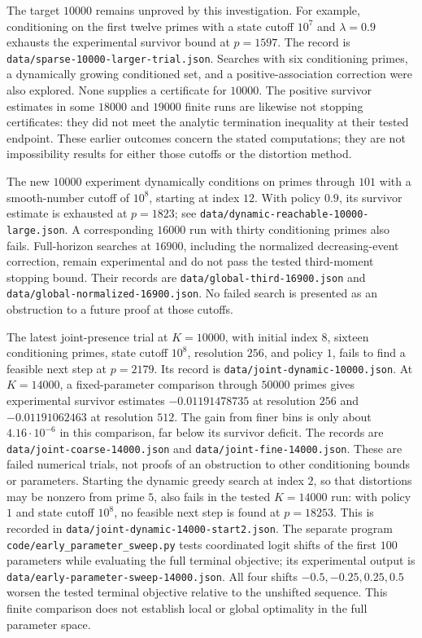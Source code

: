 \documentclass[11pt]{article}
\begin{document}
The target $10000$ remains unproved by this investigation. For example,
conditioning on the first twelve primes with a state cutoff $10^7$ and
$\lambda=0.9$ exhausts the experimental survivor bound at $p=1597$.
The record is \texttt{data/sparse-10000-larger-trial.json}. Searches with
six conditioning primes, a dynamically growing conditioned set, and a
positive-association correction were also explored. None supplies a
certificate for $10000$. The positive survivor estimates in some $18000$
and $19000$ finite runs are likewise not stopping certificates: they did
not meet the analytic termination inequality at their tested endpoint.
These earlier outcomes concern the stated computations; they are not impossibility
results for either those cutoffs or the distortion method.

The new $10000$ experiment dynamically conditions on primes through $101$
with a smooth-number cutoff of $10^8$, starting at index $12$. With policy
$0.9$, its survivor estimate is exhausted at $p=1823$; see
\texttt{data/dynamic-reachable-10000-large.json}. A corresponding $16000$
run with thirty conditioning primes also fails. Full-horizon searches at
$16900$, including the normalized decreasing-event correction, remain
experimental and do not pass the tested third-moment stopping bound.
Their records are \texttt{data/global-third-16900.json} and
\texttt{data/global-normalized-16900.json}. No failed search is presented
as an obstruction to a future proof at those cutoffs.

The latest joint-presence trial at $K=10000$, with initial index $8$,
sixteen conditioning primes, state cutoff $10^8$, resolution $256$, and
policy $1$, fails to find a feasible next step at $p=2179$. Its record is
\texttt{data/joint-dynamic-10000.json}. At $K=14000$, a fixed-parameter
comparison through $50000$ primes gives experimental survivor estimates
$-0.01191478735$ at resolution $256$ and $-0.01191062463$ at resolution
$512$. The gain from finer bins is only about $4.16\cdot10^{-6}$ in this
comparison, far below its survivor deficit. The records are
\texttt{data/joint-coarse-14000.json} and
\texttt{data/joint-fine-14000.json}. These are failed numerical trials,
not proofs of an obstruction to other conditioning bounds or parameters.
Starting the dynamic greedy search at index $2$, so that distortions may
be nonzero from prime $5$, also fails in the tested $K=14000$ run: with
policy $1$ and state cutoff $10^8$, no feasible next step is found at
$p=18253$. This is recorded in
\texttt{data/joint-dynamic-14000-start2.json}. The separate program
\texttt{code/early\_parameter\_sweep.py} tests coordinated logit shifts
of the first $100$ parameters while evaluating the full terminal objective;
its experimental output is \texttt{data/early-parameter-sweep-14000.json}.
All four shifts $-0.5,-0.25,0.25,0.5$ worsen the tested terminal objective
relative to the unshifted sequence. This finite comparison does not
establish local or global optimality in the full parameter space.
\end{document}
